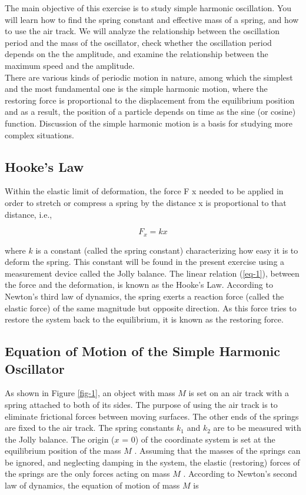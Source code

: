 \documentclass{article}
\begin{document}
The main objective of this exercise is to study simple harmonic oscillation. You will
learn how to find the spring constant and effective mass of a spring, and how to use the
air track. We will analyze the relationship between the oscillation period and the mass
of the oscillator, check whether the oscillation period depends on the the amplitude, and
examine the relationship between the maximum speed and the amplitude.
\\

There are various kinds of periodic motion in nature, among which the simplest and
the most fundamental one is the simple harmonic motion, where the restoring force is
proportional to the displacement from the equilibrium position and as a result, the position
of a particle depends on time as the sine (or cosine) function. Discussion of the simple
harmonic motion is a basis for studying more complex situations.

\subsection{Hooke’s Law}

Within the elastic limit of deformation, the force F x needed to be applied in order to
stretch or compress a spring by the distance x is proportional to that distance, i.e.,

\begin{equation}\label{eq-1}
F_x=kx
\end{equation}

where $k$ is a constant (called the spring constant) characterizing how easy it is to deform
the spring. This constant will be found in the present exercise using a measurement device
called the Jolly balance. The linear relation (\ref{eq-1}), between the force and the deformation, is
known as the Hooke’s Law. According to Newton’s third law of dynamics, the spring exerts
a reaction force (called the elastic force) of the same magnitude but opposite direction. As
this force tries to restore the system back to the equilibrium, it is known as the restoring
force.

\subsection{Equation of Motion of the Simple Harmonic Oscillator}

As shown in Figure \ref{fig-1}, an object with mass $M$ is set on an air track with a spring
attached to both of its sides. The purpose of using the air track is to eliminate frictional
forces between moving surfaces. The other ends of the springs are fixed to the air track.
The spring constants $k_1$ and $k_2$ are to be measured with the Jolly balance. The origin
($x$ = 0) of the coordinate system is set at the equilibrium position of the mass $M$ .
Assuming that the masses of the springs can be ignored, and neglecting damping in the
system, the elastic (restoring) forces of the springs are the only forces acting on mass $M$ .
According to Newton’s second law of dynamics, the equation of motion of mass $M$ is
\end{document}
